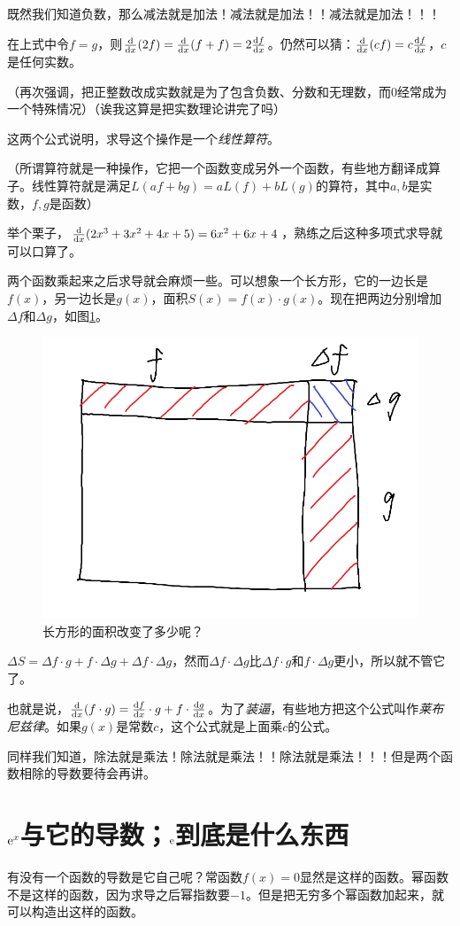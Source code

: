 既然我们知道负数，那么减法就是加法！减法就是加法！！减法就是加法！！！

在上式中令$f=g$，则$\frac{\mathop{}\!\mathrm{d}}{\mathop{}\!\mathrm{d} x}(2f)=\frac{\mathop{}\!\mathrm{d}}{\mathop{}\!\mathrm{d} x}(f+f)=2\frac{\mathop{}\!\mathrm{d} f}{\mathop{}\!\mathrm{d} x}$。仍然可以猜：$\frac{\mathop{}\!\mathrm{d}}{\mathop{}\!\mathrm{d} x}(c f)=c \frac{\mathop{}\!\mathrm{d} f}{\mathop{}\!\mathrm{d} x}$，$c$是任何实数。

（再次强调，把正整数改成实数就是为了包含负数、分数和无理数，而$0$经常成为一个特殊情况）（诶我这算是把实数理论讲完了吗）

这两个公式说明，求导这个操作是一个\emph{线性算符}。

（所谓算符就是一种操作，它把一个函数变成另外一个函数，有些地方翻译成算子。线性算符就是满足$L(a f+b g)=a L(f)+b L(g)$的算符，其中$a,b$是实数，$f,g$是函数）

举个栗子，$\frac{\mathop{}\!\mathrm{d}}{\mathop{}\!\mathrm{d} x}(2x^3+3x^2+4x+5)=6x^2+6x+4$，熟练之后这种多项式求导就可以口算了。

两个函数乘起来之后求导就会麻烦一些。可以想象一个长方形，它的一边长是$f(x)$，另一边长是$g(x)$，面积$S(x)=f(x) \cdot g(x)$。现在把两边分别增加$\Delta f$和$\Delta g$，如图\ref{fig-rect}。
\begin{figure}[htb]
\centering
\includegraphics[width=0.33\linewidth]{fig/rect.png}
\caption{长方形的面积改变了多少呢？}
\label{fig-rect}
\end{figure}

$\Delta S=\Delta f \cdot g+f \cdot \Delta g+\Delta f \cdot \Delta g$，然而$\Delta f \cdot \Delta g$比$\Delta f \cdot g$和$f \cdot \Delta g$更小，所以就不管它了。

也就是说，$\frac{\mathop{}\!\mathrm{d}}{\mathop{}\!\mathrm{d} x}(f \cdot g)=\frac{\mathop{}\!\mathrm{d} f}{\mathop{}\!\mathrm{d} x} \cdot g+f \cdot \frac{\mathop{}\!\mathrm{d} g}{\mathop{}\!\mathrm{d} x}$。为了\emph{装逼}，有些地方把这个公式叫作\emph{莱布尼兹律}。如果$g(x)$是常数$c$，这个公式就是上面乘$c$的公式。

同样我们知道，除法就是乘法！除法就是乘法！！除法就是乘法！！！但是两个函数相除的导数要待会再讲。
\section{$\mathrm{e}^x$与它的导数；$\mathrm{e}$到底是什么东西}
有没有一个函数的导数是它自己呢？常函数$f(x)=0$显然是这样的函数。幂函数不是这样的函数，因为求导之后幂指数要$-1$。但是把无穷多个幂函数加起来，就可以构造出这样的函数。

